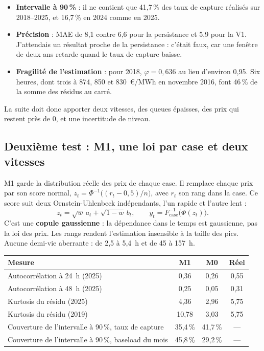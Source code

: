 \documentclass[11pt,a4paper]{article}
\newcounter{qr}
\begin{document}
\begin{itemize}
\item \textbf{Intervalle à 90\,\%} : il ne contient que 41,7\,\% des taux de capture réalisés sur 2018--2025, et 16,7\,\% en 2024 comme en 2025.
\item \textbf{Précision} : MAE de 8,1 contre 6,6 pour la persistance et 5,9 pour la V1. J'attendais un résultat proche de la persistance : c'était faux, car une fenêtre de deux ans retarde quand le taux de capture baisse.
\item \textbf{Fragilité de l'estimation} : pour 2018, $\hat\varphi = 0{,}636$ au lieu d'environ 0,95. Six heures, dont trois à 874, 850 et 830~€/MWh en novembre 2016, font 46\,\% de la somme des résidus au carré.
\end{itemize}

La suite doit donc apporter deux vitesses, des queues épaisses, des prix qui restent près de 0, et une incertitude de niveau.

\subsection{Deuxième test : M1, une loi par case et deux vitesses}

M1 garde la distribution réelle des prix de chaque case. Il remplace chaque prix par son score normal, $z_t = \Phi^{-1}\big((r_t - 0{,}5)/n\big)$, avec $r_t$ son rang dans la case. Ce score suit deux Ornstein-Uhlenbeck indépendants, l'un rapide et l'autre lent :
\[
z_t = \sqrt{w}\,a_t + \sqrt{1-w}\,b_t ,
\qquad
y_t = F^{-1}_{\text{case}}\big(\Phi(z_t)\big).
\]
C'est une \textbf{copule gaussienne} : la dépendance dans le temps est gaussienne, pas la loi des prix. Les rangs rendent l'estimation insensible à la taille des pics. Aucune demi-vie aberrante : de 2,5 à 5,4~h et de 45 à 157~h.

\begin{center}
\small
\begin{tabular}{lccc}
\toprule
\textbf{Mesure} & \textbf{M1} & \textbf{M0} & \textbf{Réel} \\
\midrule
Autocorrélation à 24~h (2025) & 0,36 & 0,26 & 0,55 \\
Autocorrélation à 48~h (2025) & 0,25 & 0,05 & 0,31 \\
Kurtosis du résidu (2025) & 4,36 & 2,96 & 5,75 \\
Kurtosis du résidu (2019) & 10,78 & 3,03 & 5,75 \\
Couverture de l'intervalle à 90\,\%, taux de capture & 35,4\,\% & 41,7\,\% & --- \\
Couverture de l'intervalle à 90\,\%, baseload du mois & 45,8\,\% & 29,2\,\% & --- \\
\bottomrule
\end{tabular}
\end{center}
\end{document}

